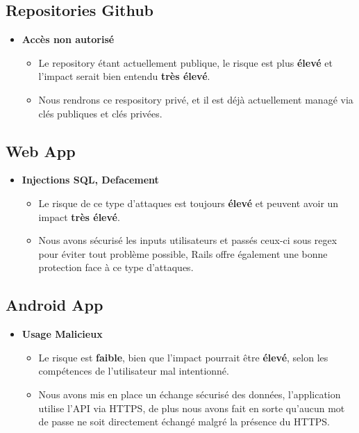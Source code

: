 \documentclass{report}
\begin{document}
		\subsection{Repositories Github}

			\begin{itemize}
				\item \textbf{Accès non autorisé}\\
					\begin{itemize}
						\item Le repository étant actuellement publique, le risque est plus \textbf{élevé} et l'impact serait bien entendu \textbf{très élevé}.
						\item Nous rendrons ce respository privé, et il est déjà actuellement managé via clés publiques et clés privées.\\
					\end{itemize}
			\end{itemize}

		\subsection{Web App}

			\begin{itemize}
				\item \textbf{Injections SQL, Defacement}\\
					\begin{itemize}
						\item Le risque de ce type d'attaques est toujours \textbf{élevé} et peuvent avoir un impact \textbf{très élevé}.\\
						\item Nous avons sécurisé les inputs utilisateurs et passés ceux-ci sous regex pour éviter tout problème possible, Rails offre également une bonne protection face à ce type d'attaques.\\
					\end{itemize}
			\end{itemize}

		\subsection{Android App}

			\begin{itemize}
				\item \textbf{Usage Malicieux}\\
					\begin{itemize}
						\item Le risque est \textbf{faible}, bien que l'impact pourrait être \textbf{élevé}, selon les compétences de l'utilisateur mal intentionné.\\
						\item Nous avons mis en place un échange sécurisé des données, l'application utilise l'API via HTTPS, de plus nous avons fait en sorte qu'aucun mot de passe ne soit directement échangé malgré la présence du HTTPS.\\
					\end{itemize}
			\end{itemize}
\end{document}
